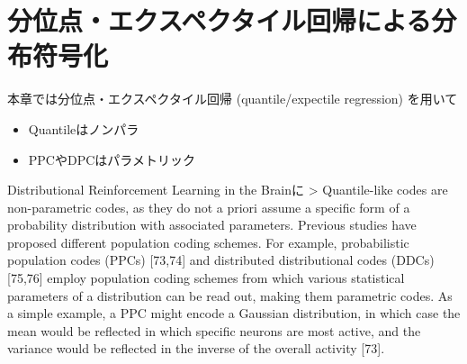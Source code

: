 \section{分位点・エクスペクタイル回帰による分布符号化}
本章では分位点・エクスペクタイル回帰 (quantile/expectile regression) を用いて

\begin{itemize}
\item Quantileはノンパラ
\item PPCやDPCはパラメトリック
\end{itemize}

Distributional Reinforcement Learning in the Brainに
> Quantile-like codes are non-parametric codes, as they do not a priori assume a specific form of a probability distribution with associated parameters. Previous studies have proposed different population coding schemes. For example, probabilistic population codes (PPCs) [73,74] and distributed distributional codes (DDCs) [75,76] employ population coding schemes from which various statistical parameters of a distribution can be read out, making them parametric codes. As a simple example, a PPC might encode a Gaussian distribution, in which case the mean would be reflected in which specific neurons are most active, and the variance would be reflected in the inverse of the overall activity [73].
